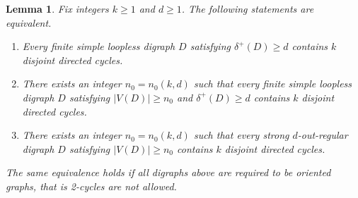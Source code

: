 \documentclass[a4paper,12pt]{article}
\newtheorem{lemma}[theorem]{Lemma}
\numberwithin{equation}{section}
\begin{document}
\begin{lemma} \label{lem:large-order-equivalence}
Fix integers $k\ge1$ and $d\ge1$. The following statements are equivalent.
\begin{enumerate}
    \item[\textup{(i)}] Every finite simple loopless digraph $D$ satisfying $\delta^+(D)\ge d $ contains $k$ disjoint directed cycles.
    \item[\textup{(ii)}] There exists an integer $n_0=n_0(k,d)$ such that every finite simple loopless digraph $D$ satisfying $|V(D)|\ge n_0 $ and $\delta^+(D)\ge d $ contains $k$ disjoint directed cycles.
    \item[\textup{(iii)}] There exists an integer $n_0=n_0(k,d)$ such that every strong $d$-out-regular digraph $D$ satisfying $|V(D)|\ge n_0 $ contains $k$ disjoint directed cycles.
\end{enumerate}
The same equivalence holds if all digraphs above are required to be oriented graphs, that is 2-cycles are not allowed.
\end{lemma}
\end{document}
